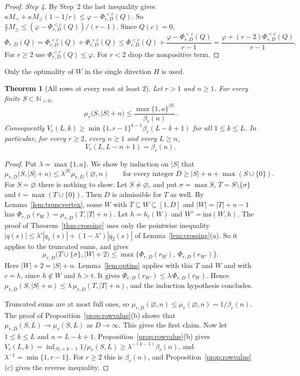 \documentclass[11pt]{article}
\newtheorem{theorem}{Theorem}[section]
\newcommand{\N}{\mathbb N}
\begin{document}
\begin{proof}
\emph{Step 4.}  By Step~2 the last inequality gives
$\kappa M_<+\kappa M_\ge(1-1/r)\le\varphi-\Phi_{r,D}^{<c}(Q)$.  So
$\frac\kappa rM_\ge\le(\varphi-\Phi_{r,D}^{<c}(Q))/(r-1)$.  Since $Q(c)=0$,
\[
  \Phi_{r,D}(Q)=\Phi_{r,D}^{<c}(Q)+\Phi_{r,D}^{>c}(Q)
  \le\Phi_{r,D}^{<c}(Q)+\frac{\varphi-\Phi_{r,D}^{<c}(Q)}{r-1}
  =\frac{\varphi+(r-2)\Phi_{r,D}^{<c}(Q)}{r-1}.
\]
For $r\ge2$ use $\Phi_{r,D}^{<c}(Q)\le\varphi$.  For $r<2$ drop the
nonpositive term.
\end{proof}

Only the optimality of $W$ in the single direction $H$ is used.

\begin{theorem}[All rows at every root at least $2$]\label{thm:allrowstwo}
Let $r>1$ and $n\ge1$.  For every finite $S\subset\N_{>0}$,
\[
  \mu_r\bigl(S,|S|+n\bigr)\le\frac{\max\{1,a\}^{|S|}}{\beta_r(n)} .
\]
Consequently $V_r(L,k)\ge\min\{1,r-1\}^{k-1}\beta_r(L-k+1)$ for all
$1\le k\le L$.  In particular, for every $r\ge2$, every $n\ge1$ and every
$L\ge n$,
\[
  V_r(L,L-n+1)=\beta_r(n).
\]
\end{theorem}

\begin{proof}
Put $\lambda=\max\{1,a\}$.  We show by induction on $|S|$ that
\[
  \mu_{r,D}\bigl(S,|S|+n\bigr)\le\lambda^{|S|}\mu_{r,D}(\varnothing,n)
  \qquad\text{for every integer }D\ge|S|+n+\max(S\cup\{0\}).
\]
For $S=\varnothing$ there is nothing to show.  Let $S\ne\varnothing$, and put
$\sigma=\max S$, $T=S\setminus\{\sigma\}$ and $t=\max(T\cup\{0\})$.  Then $D$
is admissible for $T$ as well.  By Lemma~\ref{lem:truncvertex}, some $W$ with
$T\subseteq W\subseteq[1,D]$ and $|W|=|T|+n-1$ has
$\Phi_{r,D}(r_W)=\mu_{r,D}(T,|T|+n)$.  Let $h=h_t(W)$ and
$W'=\mathrm{ins}(W,h)$.  The proof of Theorem~\ref{thm:crossing} uses only
the pointwise inequality $|q(s)|\le\lambda'|q_1(s)|+(1-\lambda')|q_2(s)|$ of
Lemma~\ref{lem:crossing}(a).  So it applies to the truncated sums, and gives
\[
  \mu_{r,D}\bigl(T\cup\{\sigma\},|W|+2\bigr)\le
  \max\bigl\{\Phi_{r,D}(r_W),\ \Phi_{r,D}(r_{W'})\bigr\}.
\]
Here $|W|+2=|S|+n$.  Lemma~\ref{lem:optins} applies with this $T$ and $W$
and with $c=h$, since $h\notin W$ and $h>t$.  It gives
$\Phi_{r,D}(r_{W'})\le\lambda\,\Phi_{r,D}(r_W)$.  Hence
$\mu_{r,D}(S,|S|+n)\le\lambda\,\mu_{r,D}(T,|T|+n)$, and the induction
hypothesis concludes.

Truncated sums are at most full ones, so
$\mu_{r,D}(\varnothing,n)\le\mu_r(\varnothing,n)=1/\beta_r(n)$.  The proof of
Proposition~\ref{prop:rowvalue}(b) shows that $\mu_{r,D}(S,L)\to\mu_r(S,L)$
as $D\to\infty$.  This gives the first claim.  Now let $1\le k\le L$ and
$n=L-k+1$.  Proposition~\ref{prop:rowvalue}(b) gives
$V_r(L,k)=\inf_{|S|=k-1}1/\mu_r(S,L)\ge\lambda^{-(k-1)}\beta_r(n)$, and
$\lambda^{-1}=\min\{1,r-1\}$.  For $r\ge2$ this is $\beta_r(n)$, and
Proposition~\ref{prop:rowvalue}(c) gives the reverse inequality.
\end{proof}
\end{document}
